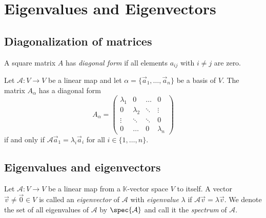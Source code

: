 \section{Eigenvalues and Eigenvectors}

\subsection{Diagonalization of matrices}
\begin{definition}
    A square matrix $A$ has \emph{diagonal form} if all elements $a_{ij}$ with $i \neq j$ are zero.
\end{definition}

\begin{theorem}
    Let $\mathcal{A}: V \to V$ be a linear map and let $\alpha = \{\vec{a}_1, \dots, \vec{a}_n\}$ be a basis of $V$. 
    The matrix $A_\alpha$ has a diagonal form 
    $$A_\alpha = \begin{pmatrix}
        \lambda_1 & 0 & \dots & 0 \\
        0 & \lambda_2 & \ddots & \vdots \\
        \vdots & \ddots & \ddots & 0\\
    0 & \dots & 0 & \lambda_n\end{pmatrix}$$
    if and only if $\mathcal{A}\vec{a}_1 = \lambda_i\vec{a}_i$ for all $i \in \{1, \dots, n\}$.
\end{theorem}

\subsection{Eigenvalues and eigenvectors}


\begin{definition}
    Let $\mathcal{A}: V \to V$ be a linear map from a $\mathbb{K}$-vector space $V$ to itself. A vector $\vec{v} \ne \vec{0} \in V$ is called an \emph{eigenvector} of $\mathcal{A}$
    with \emph{eigenvalue} $\lambda$ if $\mathcal{A}\vec{v} = \lambda\vec{v}$. We denote the set of all eigenvalues of
    $\mathcal{A}$ by $\spec{\mathcal{A}}$ and call it the \emph{spectrum} of $\mathcal{A}$.
\end{definition}


